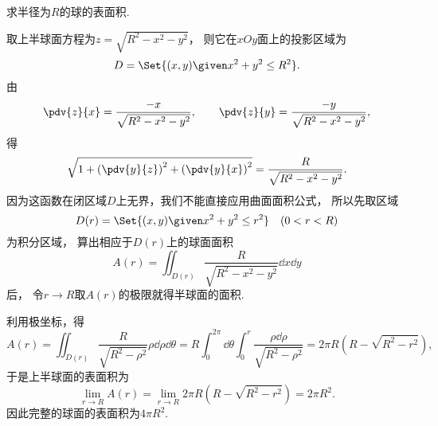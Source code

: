 \begin{example}
求半径为\(R\)的球的表面积.
\begin{solution}
取上半球面方程为\(z = \sqrt{R^2-x^2-y^2}\)，
则它在\(xOy\)面上的投影区域为\begin{equation*}
	D = \Set{(x,y) \given x^2+y^2 \leq R^2}.
\end{equation*}
由\begin{equation*}
	\pdv{z}{x} = \frac{-x}{\sqrt{R^2-x^2-y^2}},
	\qquad
	\pdv{z}{y} = \frac{-y}{\sqrt{R^2-x^2-y^2}},
\end{equation*}
得\begin{equation*}
	\sqrt{1 + \left(\pdv{y}{z}\right)^2 + \left(\pdv{y}{x}\right)^2}
	= \frac{R}{\sqrt{R^2-x^2-y^2}}.
\end{equation*}
因为这函数在闭区域\(D\)上无界，我们不能直接应用曲面面积公式，
所以先取区域\begin{equation*}
	D(r) = \Set{(x,y) \given x^2+y^2 \leq r^2}
	\quad(0<r<R)
\end{equation*}为积分区域，
算出相应于\(D(r)\)上的球面面积\begin{equation*}
	A(r) = \iint_{D(r)} \frac{R}{\sqrt{R^2-x^2-y^2}} \dd{x}\dd{y}
\end{equation*}后，
令\(r \to R\)取\(A(r)\)的极限就得半球面的面积.

利用极坐标，得\begin{equation*}
	A(r) = \iint_{D(r)} \frac{R}{\sqrt{R^2-\rho^2}} \rho\dd{\rho}\dd{\theta}
	= R \int_0^{2\pi} \dd{\theta} \int_0^r \frac{\rho \dd{\rho}}{\sqrt{R^2-\rho^2}}
	= 2\pi R(R-\sqrt{R^2-r^2}),
\end{equation*}
于是上半球面的表面积为\begin{equation*}
	\lim_{r \to R} A(r)
	= \lim_{r \to R} 2\pi R(R-\sqrt{R^2-r^2})
	= 2\pi R^2.
\end{equation*}
因此完整的球面的表面积为\(4\pi R^2\).
\end{solution}
\end{example}

